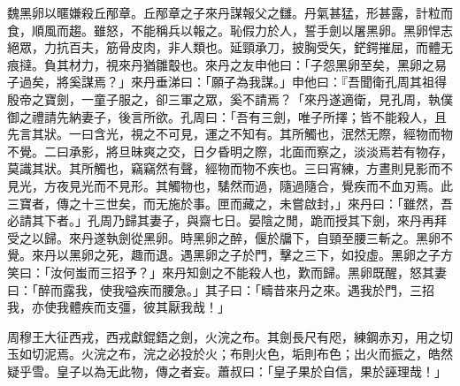 \begin{pinyinscope}
魏黑卵以暱嫌殺丘邴章。丘邴章之子來丹謀報父之讎。丹氣甚猛，形甚露，計粒而食，順風而趨。雖怒，不能稱兵以報之。恥假力於人，誓手劍以屠黑卵。黑卵悍志絕眾，力抗百夫，筋骨皮肉，非人類也。延頸承刀，披胸受矢，鋩鍔摧屈，而體无痕撻。負其材力，視來丹猶雛鷇也。來丹之友申他曰：「子怨黑卵至矣，黑卵之易子過矣，將奚謀焉？」來丹垂涕曰：「願子為我謀。」申他曰：『吾聞衛孔周其祖得殷帝之寶劍，一童子服之，卻三軍之眾，奚不請焉？「來丹遂適衛，見孔周，執僕御之禮請先納妻子，後言所欲。孔周曰：「吾有三劍，唯子所擇；皆不能殺人，且先言其狀。一曰含光，視之不可見，運之不知有。其所觸也，泯然无際，經物而物不覺。二曰承影，將旦昧爽之交，日夕昏明之際，北面而察之，淡淡焉若有物存，莫識其狀。其所觸也，竊竊然有聲，經物而物不疾也。三曰宵練，方晝則見影而不見光，方夜見光而不見形。其觸物也，騞然而過，隨過隨合，覺疾而不血刃焉。此三寶者，傳之十三世矣，而无施於事。匣而藏之，未嘗啟封，」來丹曰：「雖然，吾必請其下者。」孔周乃歸其妻子，與齋七日。晏陰之閒，跪而授其下劍，來丹再拜受之以歸。來丹遂執劍從黑卵。時黑卵之醉，偃於牖下，自頸至腰三斬之。黑卵不覺。來丹以黑卵之死，趣而退。遇黑卵之子於門，擊之三下，如投虛。黑卵之子方笑曰：「汝何蚩而三招予？」來丹知劍之不能殺人也，歎而歸。黑卵既醒，怒其妻曰：「醉而露我，使我嗌疾而腰急。」其子曰：「疇昔來丹之來。遇我於門，三招我，亦使我體疾而支彊，彼其厭我哉！」

周穆王大征西戎，西戎獻錕鋙之劍，火浣之布。其劍長尺有咫，練鋼赤刃，用之切玉如切泥焉。火浣之布，浣之必投於火；布則火色，垢則布色；出火而振之，皓然疑乎雪。皇子以為无此物，傳之者妄。蕭叔曰：「皇子果於自信，果於誣理哉！」


\end{pinyinscope}